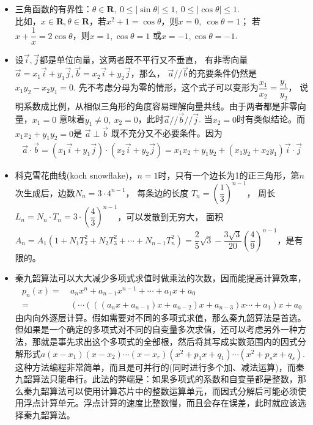 \begin{itemize}[leftmargin=\inteval{\myitemleftmargin}pt,itemsep=
   \inteval{\myitemitempsep}pt,topsep=\inteval{\myitemtopsep}pt]
\item 三角函数的有界性：$ \theta\in\textbf{R},\ 0\leq |\sin \theta|
\leq 1,\ 0\leq |\cos \theta|\leq 1 $.\\ 比如，$ x\in \textbf{R},\theta 
\in \textbf{R} $，若$ x^2+1=\cos\theta $，则$ x=0,\ \cos\theta=1 $；
若$ x+\dfrac{1}{x}=2\cos\theta $，则$ x=1,\cos\theta=1 $
或$ x=-1,\cos\theta=-1 $. 

\item 设$ \vec{i},\vec{j} $都是单位向量，这两者既不平行又不垂直，
有非零向量$ \vec{a}=x_1\vec{i}+y_1\vec{j},
\vec{b}=x_2\vec{i}+y_2\vec{j} $，那么，
$ \vec{a}//\vec{b} $的充要条件仍然是$ x_1y_2-x_2y_1=0 $. 
先不考虑分母为零的情形，这个式子可以变形为$ \dfrac{x_1}{x_2}=\dfrac{y_1}{y_2} $，
说明系数成比例，从相似三角形的角度容易理解向量共线。由于两者都是非零向量，$ x_1=0 $
意味着$ y_1\neq 0,\ x_2=0 $，此时$ \vec{a}//\vec{b}//
\vec{j} $. 当$ x_2=0 $时有类似结论。而$ x_1x_2+y_1y_2=0 $是
$ \vec{a}\perp\vec{b} $
既不充分又不必要条件。因为
\begin{gather*}
    \vec{a}\cdot\vec{b}=(x_1\vec{i}+
    y_1\vec{j})\cdot(x_2\vec{i}+y_2\vec{j})
    =x_1x_2+y_1y_2+(x_1y_2+x_2y_1)\vec{i}\cdot \vec{j}
\end{gather*}

\item 科克雪花曲线(koch snowflake)，$ n=1 $时，只有一个边长为1的正三角形，第$ n $次生成后，边数$ N_n=3 \cdot 4^{n-1} $，
每条边的长度 $ T_n=\left(\dfrac{1}{3} \right)^{n-1}  $，
周长$ L_n=N_n \cdot T_n=3\cdot \left( \dfrac{4}{3}\right)^{n-1}  $，可以发散到无穷大，
面积$ A_n =A_1(1+N_1 T_2^2+N_2T_3^2+\cdots +N_{n-1}T_n^2)
=\dfrac{2}{5}\sqrt{3}-\dfrac{3\sqrt{3}}{20}\left(\dfrac{4}{9} \right)^{n-1}  $，是有限的。

\item 秦九韶算法可以大大减少多项式求值时做乘法的次数，因而能提高计算效率，
\begin{align*}
    p_n(x) =&\ a_nx^n+a_{n-1}x^{n-1}+\cdots + a_1x+a_0 \\
    =&\ (\cdots (((a_nx+a_{n-1})x+a_{n-2})x+a_{n-3})x\cdots +a_1)x+a_0
\end{align*}	
由内向外逐层计算。假如需要对不同的多项式求值，那么秦九韶算法是首选。但如果是一个确定的多项式对不同的自变量多次求值，还可以考虑另外一种方法，那就是事先求出这个多项式的全部根，然后将其写成实数范围内的因式分解形式$ a(x-x_1)(x-x_2)\cdots (x-x_r)(x^2+p_1x+q_1)\cdots(x^2+p_sx+q_s) $. 这种方法编程非常简单，而且是可并行的(同时进行多个加、减法运算)，而秦九韶算法只能串行。此法的弊端是：如果多项式的系数和自变量都是整数，那么秦九韶算法可以使用计算芯片中的整数运算单元，而因式分解后可能必须使用浮点计算单元。浮点计算的速度比整数慢，而且会存在误差，此时就应该选择秦九韶算法。


\end{itemize}
